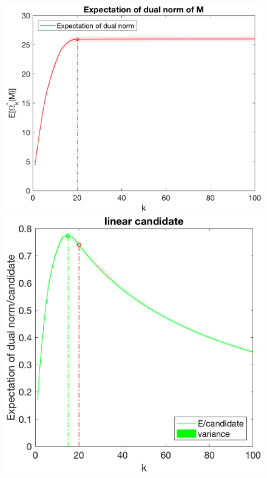 \documentclass[12pt]{article}
\begin{document}
\begin{figure}[h]
    \begin{minipage}[c]{.3\linewidth}
        \centering
        \includegraphics[width=\linewidth]{Fig/dualnorm-u0rand-k0-20.eps}
    \end{minipage}
    \hfill%
    \begin{minipage}[c]{.3\linewidth}
        \centering
        \includegraphics[width=\linewidth]{Fig/dualnorm-u0rand-k0-20-candidatelin.eps}

\end{minipage}
\end{figure}
\end{document}
